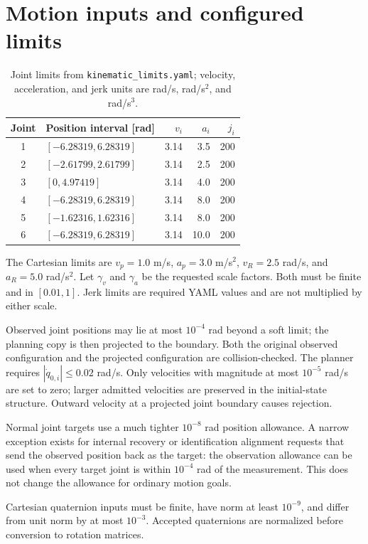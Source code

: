 \documentclass[11pt,a4paper]{report}
\newcommand{\file}[1]{\nolinkurl{#1}}
\begin{document}
\section{Motion inputs and configured limits}
\begin{table}[htbp]
\centering
\begin{tabular}{@{}clrrr@{}}
\toprule
Joint & Position interval [rad] & $v_i$ & $a_i$ & $j_i$ \\
\midrule
1 & $[-6.28319,6.28319]$ & 3.14 & 3.5 & 200\\
2 & $[-2.61799,2.61799]$ & 3.14 & 2.5 & 200\\
3 & $[0,4.97419]$ & 3.14 & 4.0 & 200\\
4 & $[-6.28319,6.28319]$ & 3.14 & 8.0 & 200\\
5 & $[-1.62316,1.62316]$ & 3.14 & 8.0 & 200\\
6 & $[-6.28319,6.28319]$ & 3.14 & 10.0 & 200\\
\bottomrule
\end{tabular}
\caption{Joint limits from \file{kinematic_limits.yaml}; velocity, acceleration,
and jerk units are rad/s, rad/s$^2$, and rad/s$^3$.}
\end{table}
The Cartesian limits are $v_p=1.0$ m/s, $a_p=3.0$ m/s$^2$,
$v_R=2.5$ rad/s, and $a_R=5.0$ rad/s$^2$. Let $\gamma_v$ and $\gamma_a$
be the requested scale factors. Both must be finite and in $[0.01,1]$.
Jerk limits are required YAML values and are not multiplied by either scale.

Observed joint positions may lie at most $10^{-4}$ rad beyond a soft limit;
the planning copy is then projected to the boundary. Both the original
observed configuration and the projected configuration are collision-checked.
The planner requires $|\dot q_{0,i}|\le0.02$ rad/s. Only velocities with
magnitude at most $10^{-5}$ rad/s are set to zero; larger admitted velocities
are preserved in the initial-state structure. Outward velocity at a projected
joint boundary causes rejection.

Normal joint targets use a much tighter $10^{-8}$ rad position allowance.
A narrow exception exists for internal recovery or identification alignment
requests that send the observed position back as the target: the observation
allowance can be used when every target joint is within $10^{-4}$ rad of the
measurement. This does not change the allowance for ordinary motion goals.

Cartesian quaternion inputs must be finite, have norm at least $10^{-9}$,
and differ from unit norm by at most $10^{-3}$. Accepted quaternions are
normalized before conversion to rotation matrices.
\end{document}
